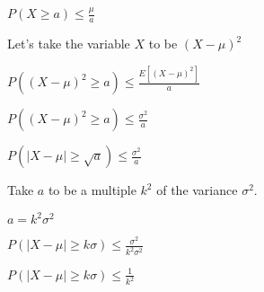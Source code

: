 $P(X\ge a)\le \frac{\mu }{a}$

Let’s take the variable \(X\) to be \((X-\mu )^2\)

$P((X-\mu )^2\ge a)\le \frac{E[(X-\mu )^2]}{a}$

$P((X-\mu )^2\ge a)\le \frac{\sigma^2}{a}$

$P(|X-\mu | \ge \sqrt{a})\le \frac{\sigma^2}{a}$

Take \(a\) to be a multiple \(k^2\) of the variance \(\sigma^2\).

$a=k^2\sigma^2$

$P(|X-\mu | \ge k\sigma )\le \frac{\sigma^2}{k^2\sigma^2}$

$P(|X-\mu | \ge k\sigma )\le \frac{1}{k^2}$

